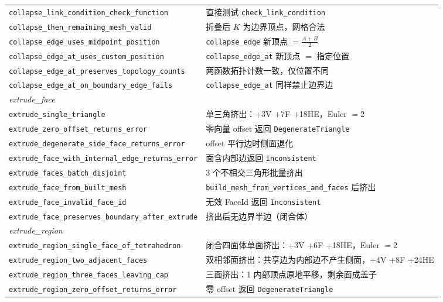 \documentclass[11pt,a4paper]{article}
\begin{document}
\begin{center}
\begin{longtable}{@{}ll@{}}
  \texttt{collapse\_link\_condition\_check\_function} & 直接测试 \texttt{check\_link\_condition} \\
  \texttt{collapse\_then\_remaining\_mesh\_valid}    & 折叠后 $K$ 为边界顶点，网格合法 \\
  \texttt{collapse\_edge\_uses\_midpoint\_position}  & \texttt{collapse\_edge} 新顶点 $= \frac{A+B}{2}$ \\
  \texttt{collapse\_edge\_at\_uses\_custom\_position} & \texttt{collapse\_edge\_at} 新顶点 $=$ 指定位置 \\
  \texttt{collapse\_edge\_at\_preserves\_topology\_counts} & 两函数拓扑计数一致，仅位置不同 \\
  \texttt{collapse\_edge\_at\_on\_boundary\_edge\_fails} & \texttt{collapse\_edge\_at} 同样禁止边界边 \\
  \midrule
  \multicolumn{2}{l}{\textit{extrude\_face}} \\
  \texttt{extrude\_single\_triangle}                 & 单三角挤出：+3V +7F +18HE，Euler $=2$ \\
  \texttt{extrude\_zero\_offset\_returns\_error}     & 零向量 offset 返回 \texttt{DegenerateTriangle} \\
  \texttt{extrude\_degenerate\_side\_face\_returns\_error} & offset 平行边时侧面退化 \\
  \texttt{extrude\_face\_with\_internal\_edge\_returns\_error} & 面含内部边返回 \texttt{Inconsistent} \\
  \texttt{extrude\_faces\_batch\_disjoint}           & 3 个不相交三角形批量挤出 \\
  \texttt{extrude\_face\_from\_built\_mesh}          & \texttt{build\_mesh\_from\_vertices\_and\_faces} 后挤出 \\
  \texttt{extrude\_face\_invalid\_face\_id}          & 无效 FaceId 返回 \texttt{Inconsistent} \\
  \texttt{extrude\_face\_preserves\_boundary\_after\_extrude} & 挤出后无边界半边（闭合体） \\
  \midrule
  \multicolumn{2}{l}{\textit{extrude\_region}} \\
  \texttt{extrude\_region\_single\_face\_of\_tetrahedron} & 闭合四面体单面挤出：+3V +6F +18HE，Euler $=2$ \\
  \texttt{extrude\_region\_two\_adjacent\_faces}     & 双相邻面挤出：共享边为内部边不产生侧面，+4V +8F +24HE \\
  \texttt{extrude\_region\_three\_faces\_leaving\_cap} & 三面挤出：1 内部顶点原地平移，剩余面成盖子 \\
  \texttt{extrude\_region\_zero\_offset\_returns\_error} & 零 offset 返回 \texttt{DegenerateTriangle} \\

\end{longtable}
\end{center}
\end{document}
